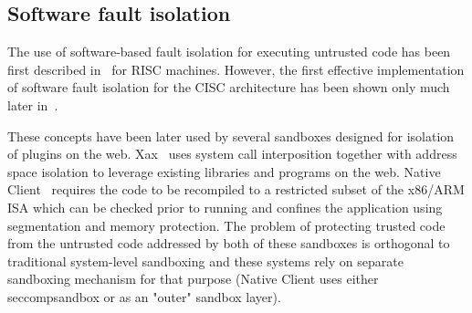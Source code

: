 \subsection{Software fault isolation}
\label{related:sfi}

The use of software-based fault isolation for executing untrusted code has been
first described in~\cite{sfi:sosp93} for RISC machines. However, the first
effective implementation of software fault isolation for the CISC architecture
has been shown only much later in~\cite{cisc-sfi:usenix-sec06}.

These concepts have been later used by several sandboxes designed for isolation
of plugins on the web. Xax~\cite{douceur08} uses system call interposition
together with address space isolation to leverage existing libraries and
programs on the web. Native Client~\cite{nacl} requires the code to be
recompiled to a restricted subset of the x86/ARM ISA which can be checked prior
to running and confines the application using segmentation and memory
protection.  The problem of protecting trusted code from the untrusted code
addressed by both of these sandboxes is orthogonal to traditional system-level
sandboxing and these systems rely on separate sandboxing mechanism for that
purpose (\eg Native Client uses either \textsf{seccompsandbox} or \seccompbpf
as an "outer" sandbox layer).


